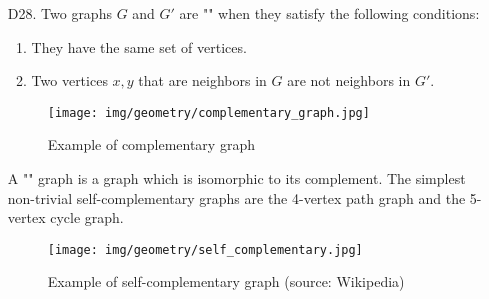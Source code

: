 {\begin{enumerate}
\begin{dem}
\begin{enumerate}
\begin{itemize}
			\item Consider the partial graph $H$ consisting of the edges outside the cycle $\phi$. The vertices of $H$ are also of even degree, the cyle containing an even number of edges incident to each vertex. By induction each connex component $H_i$ of $H$ is an Eulerian graph, and so has an Eulerian cycle $\phi_i$. To rebuild an Euler cycle on $G$, we only need to merge the cyle $\phi$ the with different cycles $\phi$. For this, we travel the cycle $\phi$ from an arbitrary vertices; when we meet for the first time a vertices $x$ from $H_i$, we substitute it the cycle $\phi_i$. The resulting cycle is an Euler cycle in $G$, the cycle $\phi$ and the cycles $\phi_i$ form a partition of the edges.
			\begin{figure}[H]
				\centering
				\texttt{[image: img/geometry/parties\_eulerian\_graph.jpg]}
			\end{figure}
		\end{itemize}
	\end{enumerate}
	\begin{flushright}
		$\square$  Q.E.D.
	\end{flushright}
	\end{dem}
	\begin{tcolorbox}[title=Remark,colframe=black,arc=10pt]
	This principle of decomposing a graph into connex graphs and summing them permits to build a recursive algorithm for determining if a graph is Eulerian or not.
	\end{tcolorbox}
	
	\item[D28.] Two graphs $G$ and $G'$ are "" when they satisfy the following conditions:
	\begin{enumerate}
		\item They have the same set of vertices.
	
		\item Two vertices $x, y$ that are neighbors in $G$ are not neighbors in $G'$.
	\end{enumerate}
	\begin{figure}[H]
		\centering
		\texttt{[image: img/geometry/complementary\_graph.jpg]}
		\caption{Example of complementary graph}
	\end{figure}
	A "" graph is a graph which is isomorphic to its complement. The simplest non-trivial self-complementary graphs are the 4-vertex path graph and the 5-vertex cycle graph.
	\begin{figure}[H]
		\centering
		\texttt{[image: img/geometry/self\_complementary.jpg]}
		\caption[Example of self-complementary graph]{Example of self-complementary graph (source: Wikipedia)}
	\end{figure}
	

\end{enumerate}}
